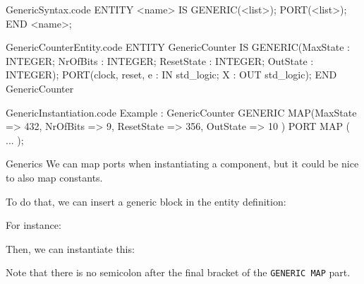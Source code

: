 \documentclass[a4paper]{article}
\begin{document}
\begin{filecontents*}[overwrite]{GenericSyntax.code}
ENTITY <name> IS
    GENERIC(<list>);
    PORT(<list>);
END <name>;
\end{filecontents*}

\begin{filecontents*}[overwrite]{GenericCounterEntity.code}
ENTITY GenericCounter IS
    GENERIC(MaxState : INTEGER;
            NrOfBits : INTEGER;
            ResetState : INTEGER;
            OutState : INTEGER);
    PORT(clock, reset, e : IN std_logic;
         X : OUT std_logic);
END GenericCounter
\end{filecontents*}

\begin{filecontents*}[overwrite]{GenericInstantiation.code}
Example : GenericCounter
    GENERIC MAP(MaxState => 432,
                NrOfBits => 9,
                ResetState => 356,
                OutState => 10 )
    PORT MAP ( ... );
\end{filecontents*}


\begin{parag}{Generics}
    We can map ports when instantiating a component, but it could be nice to also map constants. 

    To do that, we can insert a generic block in the entity definition:
    
    For instance:
    
    Then, we can instantiate this:
    
    Note that there is no semicolon after the final bracket of the \texttt{GENERIC MAP} part.
\end{parag}
\end{document}
